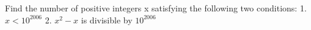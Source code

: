 Find the number of positive integers x satisfying the following two conditions:
1. \(x<10^{2006}\)
2. \(x^{2}-x\) is divisible by \(10^{2006}\)